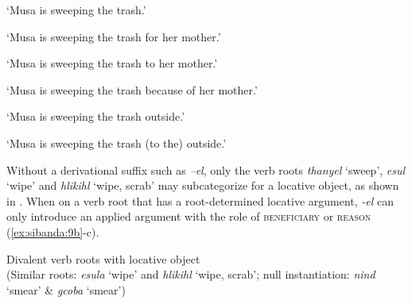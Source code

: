 \documentclass[output=paper]{langsci/langscibook}
\begin{document}
\glt ‘Musa is sweeping the trash.’


\glt ‘Musa is sweeping the trash for her mother.’


\glt ‘Musa is sweeping the trash to her mother.’


\glt ‘Musa is sweeping the trash because of her mother.’


\glt ‘Musa is sweeping the trash outside.’


\glt ‘Musa is sweeping the trash (to the) outside.’
\z
\z

Without a derivational suffix such as \textit{–el}, only the verb roots \textit{thanyel} ‘sweep’, \textit{esul} ‘wipe’ and \textit{hlikihl} ‘wipe, scrab’ may subcategorize for a locative object, as shown in . When on a verb root that has a root-determined locative argument, \textit{-el} can only introduce an applied argument with the role of \textsc{beneficiary} or \textsc{reason} (\ref{ex:sibanda:9b}-c). 

\ea\label{ex:sibanda:9}
\settowidth{}
{Divalent verb roots with locative object} \\
 (Similar roots: \textit{esula} ‘wipe’ and \textit{hlikihl} ‘wipe, scrab’; null instantiation: \textit{nind} ‘smear’ \& \textit{gcoba} ‘smear’)\\
\end{document}
